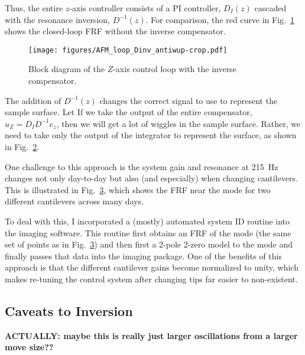 \documentclass[11pt]{article}
\begin{document}
\begin{figure}[b!]
  \centering
  
  \caption{}
  \label{fig:z_control}
\end{figure}
Thus, the entire $z$-axis controller consists of a PI controller, $D_I(z)$ cascaded with the resonance inversion, $D^{-1}(z)$. For comparison, the red curve in Fig.~\ref{fig:z_control} shows the closed-loop FRF without the inverse compensator.
\begin{figure}
  \centering
  \texttt{[image: figures/AFM\_loop\_Dinv\_antiwup-crop.pdf]}
  \caption{Block diagram of the $Z$-axis control loop with the inverse compensator.}
  \label{fig:afm_bd_dinv}
\end{figure}
The addition of $D^{-1}(z)$ changes the correct signal to use to represent the sample surface. Let 
If we take the output of the entire compensator, $u_Z=D_ID^{-1}e_z$, then we will get a lot of wiggles in the sample surface. Rather, we need to take only the output of the integrator to represent the surface, as shown in Fig.~\ref{fig:afm_bd_dinv}.


One challenge to this approach is the system gain and resonance at 215~Hz changes not only day-to-day but also (and especially) when changing cantilevers. This is illustrated in Fig.~\ref{fig:z_evolution}, which shows the FRF near the mode for two different cantilevers across many days.

\begin{figure}
  \centering
  
  \caption{}
  \label{fig:z_evolution}
\end{figure}
To deal with this, I incorporated a (mostly) automated system ID routine into the imaging software. This routine first obtains an FRF of the mode (the same set of points as in Fig.~\ref{fig:z_evolution}) and then first a 2-pole 2-zero model to the mode and finally passes that data into the imaging package. One of the benefits of this approach is that the different cantilever gains become normalized to unity, which makes re-tuning the control system after changing tips far easier to non-existent.

\subsection{Caveats to Inversion}
\textbf{ACTUALLY: maybe this is really just larger oscillations from a larger move size??}
\end{document}
